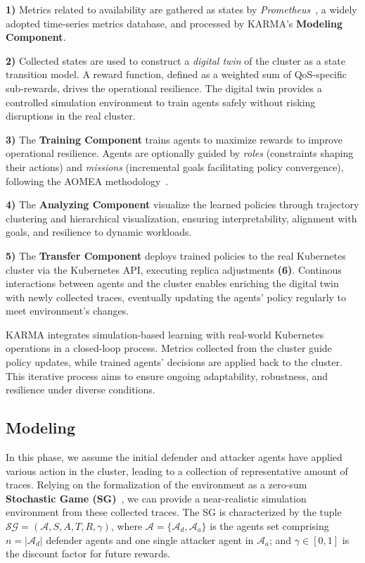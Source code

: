 \textbf{1)} Metrics related to availability are gathered as states by \textit{Prometheus}~\cite{prometheus}, a widely adopted time-series metrics database, and processed by KARMA's \textbf{Modeling Component}.

\textbf{2)} Collected states are used to construct a \textit{digital twin} of the cluster as a state transition model. A reward function, defined as a weighted sum of QoS-specific sub-rewards, drives the operational resilience. The digital twin provides a controlled simulation environment to train agents safely without risking disruptions in the real cluster.

\textbf{3)} The \textbf{Training Component} trains agents to maximize rewards to improve operational resilience. Agents are optionally guided by \textit{roles} (constraints shaping their actions) and \textit{missions} (incremental goals facilitating policy convergence), following the AOMEA methodology~\cite{soule2024aomea}.

\textbf{4)} The \textbf{Analyzing Component} visualize the learned policies through trajectory clustering and hierarchical visualization, ensuring interpretability, alignment with goals, and resilience to dynamic workloads.

\textbf{5)} The \textbf{Transfer Component} deploys trained policies to the real Kubernetes cluster via the Kubernetes API, executing replica adjustments \textbf{(6)}. Continous interactions between agents and the cluster enables enriching the digital twin with newly collected traces, eventually updating the agents' policy regularly to meet environment's changes.

KARMA integrates simulation-based learning with real-world Kubernetes operations in a closed-loop process. Metrics collected from the cluster guide policy updates, while trained agents' decisions are applied back to the cluster. This iterative process aims to ensure ongoing adaptability, robustness, and resilience under diverse conditions.


\subsection{Modeling}

In this phase, we assume the initial defender and attacker agents have applied various action in the cluster, leading to a collection of representative amount of traces. Relying on the formalization of the environment as a zero-sum \textbf{Stochastic Game (SG)}~\cite{shapley1953stochastic}, we can provide a near-realistic simulation environment from these collected traces. The SG is characterized by the tuple $\mathcal{SG} = (\mathcal{A}, S, A, T, R, \gamma)$, where $\mathcal{A} = \{\mathcal{A}_d, \mathcal{A}_a\}$ is the agents set comprising $n = |\mathcal{A}_d|$ defender agents and one single attacker agent in $\mathcal{A}_a$; and $\gamma \in [0, 1]$ is the discount factor for future rewards.

